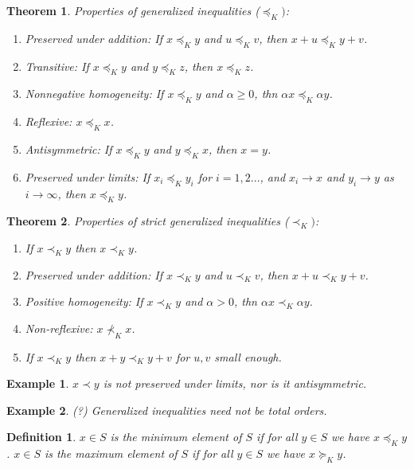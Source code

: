 \documentclass[a4paper]{article}
\newtheorem{mytheorem}{Theorem}
\newtheorem{example}{Example}
\newtheorem{mydef}{Definition}
\numberwithin{mytheorem}{section}
\numberwithin{mydef}{section}
\numberwithin{example}{section}
\begin{document}
\begin{mytheorem} Properties of generalized inequalities ($\preceq_{K})$:
\begin{enumerate}
\item Preserved under addition: If $x \preceq_{K} y$ and $u \preceq_{K} v$, then $x + u \preceq_{K}  y + v$.
\item Transitive: If $x \preceq_{K} y$ and $y \preceq_{K} z$, then $x \preceq_{K} z$.
\item Nonnegative homogeneity: If $x \preceq_{K} y$ and $\alpha \geq 0$, thn $\alpha x \preceq_{K} \alpha y$.
\item Reflexive: $x \preceq_{K} x$.
\item Antisymmetric: If $x \preceq_{K} y$ and $y \preceq_{K} x$, then $x = y$.
\item Preserved under limits: If $x_{i} \preceq_{K} y_{i}$ for $i = 1,2...$, and $x_{i} \rightarrow x$ and $y_{i} \rightarrow y$ as $i \rightarrow \infty$,  then $x \preceq_{K} y$. 
\end{enumerate}
\end{mytheorem}

\begin{mytheorem} Properties of strict generalized inequalities ($\prec_{K})$:
\begin{enumerate}
\item If $x \prec_{K} y$ then $x \prec_{K} y$.
\item Preserved under addition: If $x \prec_{K} y$ and $u \prec_{K} v$, then $x + u \prec_{K}  y + v$.
\item Positive homogeneity: If $x \prec_{K} y$ and $\alpha > 0$, thn $\alpha x \prec_{K} \alpha y$.
\item Non-reflexive: $x \nprec_{K} x$.
\item If $x \prec_{K} y$ then $x + y \prec_{K} y + v$ for $u,v$ small enough.
\end{enumerate}
\end{mytheorem}

\begin{example} $x \prec y$ is not preserved under limits, nor is it antisymmetric.
\end{example}

\begin{example} (?) Generalized inequalities need not be total orders.
\end{example}

\begin{mydef} $x \in S$ is the minimum element of $S$ if for all $y \in S$ we have $x \preceq_{K} y$. $x \in S$ is the maximum element of $S$ if for all $y \in S$ we have $x \succeq_{K} y$.\end{mydef}
\end{document}
